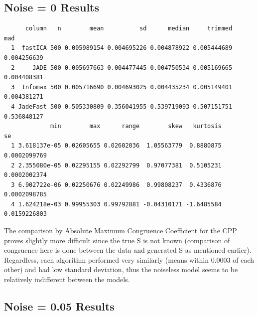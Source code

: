 \documentclass[12pt,twoside]{amherstthesis}
\begin{document}
\begin{Shaded}
\begin{Highlighting}[]
  \NormalTok{  \}}
    \NormalTok{(}
  \NormalTok{\}}
  \StringTok{ }\NormalTok{) }
  \StringTok{ }\NormalTok{) }
  \StringTok{ }\NormalTok{)  }
  \StringTok{ }\NormalTok{)}
  \end{Highlighting}
  \end{Shaded}
  
  \subsection{Noise = 0 Results}\label{noise-0-results-1}
  
  \begin{verbatim}
      column   n        mean          sd      median     trimmed         mad
  1  fastICA 500 0.005989154 0.004695226 0.004878922 0.005444689 0.004256639
  2     JADE 500 0.005697663 0.004477445 0.004750534 0.005169665 0.004408381
  3  Infomax 500 0.005716690 0.004693025 0.004435234 0.005149401 0.004381271
  4 JadeFast 500 0.505330809 0.356041955 0.539719093 0.507151751 0.536848127
             min        max      range        skew   kurtosis           se
  1 3.618137e-05 0.02605655 0.02602036  1.05563779  0.8880875 0.0002099769
  2 2.355080e-05 0.02295155 0.02292799  0.97077381  0.5105231 0.0002002374
  3 6.902722e-06 0.02250676 0.02249986  0.99808237  0.4336876 0.0002098785
  4 1.624218e-03 0.99955303 0.99792881 -0.04310171 -1.6485584 0.0159226803
  \end{verbatim}
  
  The comparison by Absolute Maximum Congruence Coefficient for the CPP
  proves slightly more difficult since the true S is not known (comparison
  of congruence here is done between the data and generated S as mentioned
  earlier). Regardless, each algorithm performed very similarly (means
  within 0.0003 of each other) and had low standard deviation, thus the
  noiseless model seems to be relatively indifferent between the models.
  
  \subsection{Noise = 0.05 Results}\label{noise-0.05-results-1}
  
\end{document}

